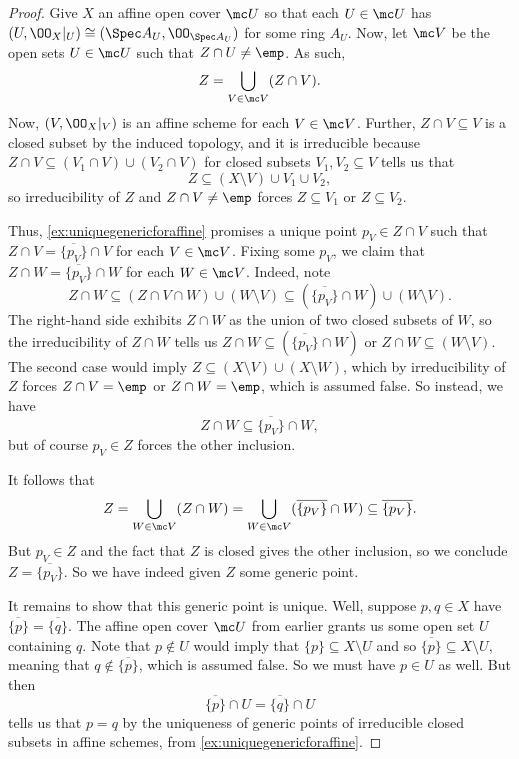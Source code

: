 \documentclass[../notes.tex]{subfiles}
\begin{document}
\begin{proof}
	Give $X$ an affine open cover $\mc U$ so that each $U\in\mc U$ has $(U,\OO_X|_U)\cong(\Spec A_U,\OO_{\Spec A_U})$ for some ring $A_U$. Now, let $\mc V$ be the open sets $U\in\mc U$ such that $Z\cap U\ne\emp$. As such,
	\[Z=\bigcup_{V\in\mc V}(Z\cap V).\]
	Now, $(V,\OO_X|_V)$ is an affine scheme for each $V\in\mc V$. Further, $Z\cap V\subseteq V$ is a closed subset by the induced topology, and it is irreducible because $Z\cap V\subseteq(V_1\cap V)\cup(V_2\cap V)$ for closed subsets $V_1,V_2\subseteq V$ tells us that
	\[Z\subseteq(X\setminus V)\cup V_1\cup V_2,\]
	so irreducibility of $Z$ and $Z\cap V\ne\emp$ forces $Z\subseteq V_1$ or $Z\subseteq V_2$.

	Thus, \autoref{ex:uniquegenericforaffine} promises a unique point $p_V\in Z\cap V$ such that $Z\cap V=\overline{\{p_V\}}\cap V$ for each $V\in\mc V$. Fixing some $p_V$, we claim that $Z\cap W=\overline{\{p_V\}}\cap W$ for each $W\in\mc V$. Indeed, note
	\[Z\cap W\subseteq(Z\cap V\cap W)\cup(W\setminus V)\subseteq(\overline{\{p_V\}}\cap W)\cup(W\setminus V).\]
	The right-hand side exhibits $Z\cap W$ as the union of two closed subsets of $W$, so the irreducibility of $Z\cap W$ tells us $Z\cap W\subseteq(\overline{\{p_V\}}\cap W)$ or $Z\cap W\subseteq(W\setminus V)$. The second case would imply $Z\subseteq(X\setminus V)\cup(X\setminus W)$, which by irreducibility of $Z$ forces $Z\cap V=\emp$ or $Z\cap W=\emp$, which is assumed false. So instead, we have
	\[Z\cap W\subseteq\overline{\{p_V\}}\cap W,\]
	but of course $p_V\in Z$ forces the other inclusion.

	It follows that
	\[Z=\bigcup_{W\in\mc V}(Z\cap W)=\bigcup_{W\in\mc V}(\overline{\{p_V\}}\cap W)\subseteq\overline{\{p_V\}}.\]
	But $p_V\in Z$ and the fact that $Z$ is closed gives the other inclusion, so we conclude $Z=\overline{\{p_V\}}$. So we have indeed given $Z$ some generic point.

	It remains to show that this generic point is unique. Well, suppose $p,q\in X$ have $\overline{\{p\}}=\overline{\{q\}}$. The affine open cover $\mc U$ from earlier grants us some open set $U$ containing $q$. Note that $p\notin U$ would imply that $\{p\}\subseteq X\setminus U$ and so $\overline{\{p\}}\subseteq X\setminus U$, meaning that $q\notin\overline{\{p\}}$, which is assumed false. So we must have $p\in U$ as well. But then
	\[\overline{\{p\}}\cap U=\overline{\{q\}}\cap U\]
	tells us that $p=q$ by the uniqueness of generic points of irreducible closed subsets in affine schemes, from \autoref{ex:uniquegenericforaffine}.
\end{proof}
\end{document}
